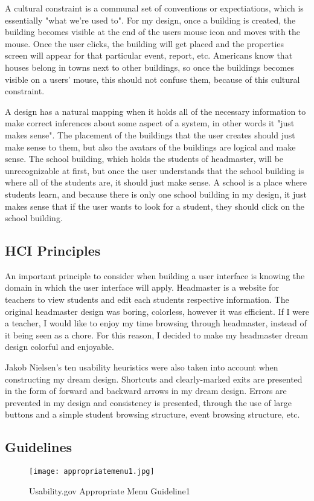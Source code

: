 \documentclass[11pt]{article}
\begin{document}
A cultural constraint is a communal set of conventions or expectiations, which is essentially "what we're used to". For my design, once a building is created, the building becomes visible at the end of the users mouse icon and moves with the mouse. Once the user clicks, the building will get placed and the properties screen will appear for that particular event, report, etc. Americans know that houses belong in towns next to other buildings, so once the buildings becomes visible on a users' mouse, this should not confuse them, because of this cultural constraint. 

A design has a natural mapping when it holds all of the necessary information to make correct inferences about some aspect of a system, in other words it "just makes sense". The placement of the buildings that the user creates should just make sense to them, but also the avatars of the buildings are logical and make sense. The school building, which holds the students of headmaster, will be unrecognizable at first, but once the user understands that the school building is where all of the students are, it should just make sense. A school is a place where students learn, and because there is only one school building in my design, it just makes sense that if the user wants to look for a student, they should click on the school building. 

\subsection{HCI Principles}
An important principle to consider when building a user interface is knowing the domain in which the user interface will apply. Headmaster is a website for teachers to view students and edit each students respective information. The original headmaster design was boring, colorless, however it was efficient. If I were a teacher, I would like to enjoy my time browsing through headmaster, instead of it being seen as a chore. For this reason, I decided to make my headmaster dream design colorful and enjoyable. 

Jakob Nielsen's ten usability heuristics were also taken into account when constructing my dream design. Shortcuts and clearly-marked exits are presented in the form of forward and backward arrows in my dream design. Errors are prevented in my design and consistency is presented, through the use of large buttons and a simple student browsing structure, event browsing structure, etc.

\subsection{Guidelines}
\begin{figure}[h]
\centering
\texttt{[image: appropriatemenu1.jpg]}
\caption{Usability.gov Appropriate Menu Guideline1}
\label{menu1}
\end{figure}
\end{document}
